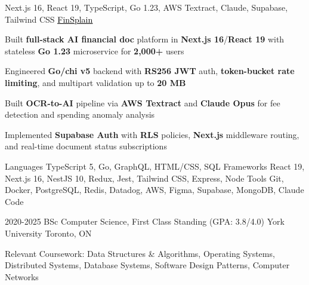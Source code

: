 \documentclass[11pt, a4paper]{awesome-cv}
\begin{document}
\begin{cventries}
\end{cventries}


\begin{cventries}
  \cventry
  {Next.js 16, React 19, TypeScript, Go 1.23, AWS Textract, Claude, Supabase, Tailwind CSS}
  {\href{https://finsplain.net}{\textcolor{black}{\underline{FinSplain}} \faExternalLink}}
  {}
  {}
  {
    \begin{cvitems}
      \item {Built \textbf{full-stack AI financial doc} platform in \textbf{Next.js 16}/\textbf{React 19} with stateless \textbf{Go 1.23} microservice for \textbf{2,000+} users}
      \item {Engineered \textbf{Go/chi v5} backend with \textbf{RS256 JWT} auth, \textbf{token-bucket rate limiting}, and multipart validation up to \textbf{20 MB}}
      \item {Built \textbf{OCR-to-AI} pipeline via \textbf{AWS Textract} and \textbf{Claude Opus} for fee detection and spending anomaly analysis}
      \item {Implemented \textbf{Supabase Auth} with \textbf{RLS} policies, \textbf{Next.js} middleware routing, and real-time document status subscriptions}
    \end{cvitems}
  }
\end{cventries}


\begin{cvskills}
  \cvskill
  {Languages}
  {TypeScript 5, Go, GraphQL, HTML/CSS, SQL}
  \cvskill
  {Frameworks}
  {React 19, Next.js 16, NestJS 10, Redux, Jest, Tailwind CSS, Express, Node}
  \cvskill
  {Tools}
  {Git, Docker, PostgreSQL, Redis, Datadog, AWS, Figma, Supabase, MongoDB, Claude Code}
\end{cvskills}

\vspace{-2mm}

\begin{cventries}
  \cventry
  {2020-2025}
  {BSc Computer Science, First Class Standing (GPA: 3.8/4.0)}
  {York University}
  {Toronto, ON}
  {%
    \begin{cvitems}
      \item {Relevant Coursework: Data Structures \& Algorithms, Operating Systems, Distributed Systems, Database Systems, Software Design Patterns, Computer Networks}
    \end{cvitems}
  }
\end{cventries}
\end{document}
